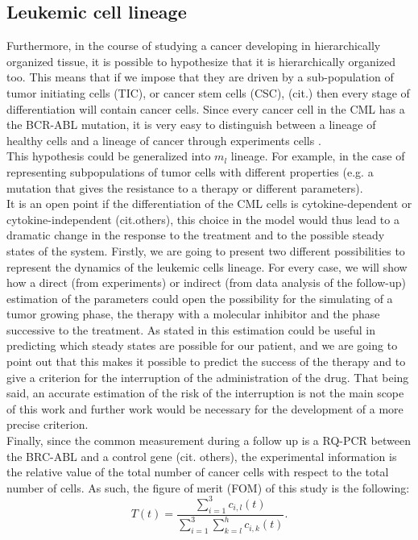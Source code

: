 \documentclass[a4paper,10pt]{article}
\begin{document}
\subsection{Leukemic cell lineage}
Furthermore, in the course of studying a cancer developing in hierarchically organized tissue,
it is possible to hypothesize that it is hierarchically organized too. This means that if we 
impose that
they are driven by a sub-population of
tumor initiating cells (TIC), or cancer stem cells (CSC), (cit.)
then every stage of differentiation will contain cancer cells.
Since every cancer cell in the CML has a the BCR-ABL mutation, 
it is very easy to distinguish  between
a lineage of healthy cells and a lineage of cancer through experiments
cells \cite{michor2005, tang2011dynamics, olshen2014dynamics, rainero2018gdna}.\\
This hypothesis could be generalized into $m_{l}$ lineage.
For example, in the case of representing subpopulations of tumor cells
with different properties (e.g. a mutation that gives the resistance to a therapy 
or different parameters).\\ 
It is an open point if the differentiation of the CML cells 
is cytokine-dependent or cytokine-independent
\cite{stiehl2018mathematical, van2007oncogenic,van2007aberrant} (cit.others), 
this choice in the model would thus lead to a dramatic change 
in the response to the treatment and to the possible steady states of the system.
Firstly, we are going to present two different possibilities to represent
the dynamics of the
leukemic cells lineage. 
For every case, we will show how a direct (from experiments) 
or indirect (from data analysis of the follow-up)
estimation of the parameters could open the possibility for the  simulating of  
a tumor growing phase, the therapy
with a molecular inhibitor and the phase successive to the treatment.
As stated in \cite{sottoriva, stiehl2018mathematical} this estimation
could be useful in predicting which steady states are possible for our patient,
and we are going to point out that this makes it 
possible to predict the success of the therapy
and to give a criterion for the interruption 
of the administration of the drug. 
That being said, an accurate estimation of the risk of the interruption 
is not the main scope of this work
and further work would be necessary for the development of a more precise criterion.\\ 
Finally, since the common measurement during
a follow up is a RQ-PCR between the BRC-ABL and a control gene \cite{michor2005, tang2011dynamics, olshen2014dynamics, rainero2018gdna}(cit. others),
the experimental information is the 
relative value of the total number 
of cancer cells with respect 
to the total number of cells.
As such, the figure of merit (FOM) of this study is the following:
\begin{equation}
T(t)=\frac{\sum_{i=1}^3c_{i,l}(t)}{\sum_{i=1}^3 \sum_{k=l}^hc_{i,k}(t)}.
\label{eq:fom}
\end{equation}
\end{document}
